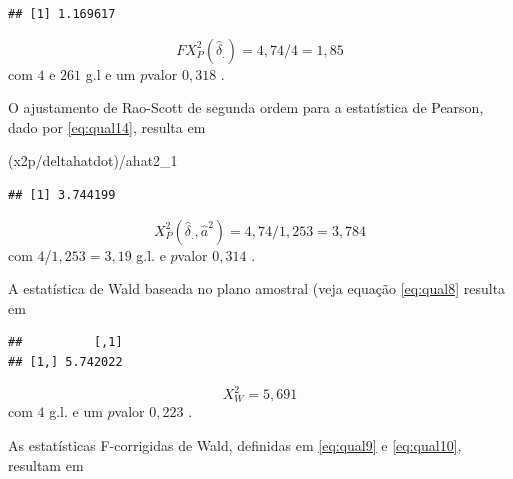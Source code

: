 \documentclass[]{book}
\newenvironment{Shaded}{\begin{snugshade}}{\end{snugshade}}
\newcommand{\KeywordTok}[1]{\textcolor[rgb]{0.13,0.29,0.53}{\textbf{{#1}}}}
\newcommand{\DataTypeTok}[1]{\textcolor[rgb]{0.13,0.29,0.53}{{#1}}}
\newcommand{\DecValTok}[1]{\textcolor[rgb]{0.00,0.00,0.81}{{#1}}}
\newcommand{\StringTok}[1]{\textcolor[rgb]{0.31,0.60,0.02}{{#1}}}
\newcommand{\NormalTok}[1]{{#1}}
\numberwithin{example}{chapter}
\numberwithin{remark}{chapter}
\numberwithin{definition}{chapter}
\begin{document}
\begin{verbatim}
## [1] 1.169617
\end{verbatim}

\[
FX_{P}^{2}\left( \hat{\delta}_{.}\right) =4,74/4=1,85
\] com \(4\) e \(261\) g.l e um \(p\)valor \(0,318\) .

O ajustamento de Rao-Scott de segunda ordem para a estatística de
Pearson, dado por \eqref{eq:qual14}, resulta em

\begin{Shaded}
\begin{Highlighting}[]
\NormalTok{(x2p/deltahatdot)/ahat2_1}
\end{Highlighting}
\end{Shaded}

\begin{verbatim}
## [1] 3.744199
\end{verbatim}

\[
X_{P}^{2}\left( \hat{\delta}_{.},\hat{a}^{2}\right) =4,74/1,253=3,784 
\] com \(4\)/\(1,253=3,19\) g.l. e \(p\)valor \(0,314\) .

A estatística de Wald baseada no plano amostral (veja equação
\eqref{eq:qual8} resulta em

\begin{Shaded}
\end{Shaded}

\begin{verbatim}
##          [,1]
## [1,] 5.742022
\end{verbatim}

\[
X_{W}^{2}=5,691 
\] com \(4\) g.l. e um \(p\)valor \(0,223\) .

As estatísticas F-corrigidas de Wald, definidas em \eqref{eq:qual9} e
\eqref{eq:qual10}, resultam em
\end{document}
